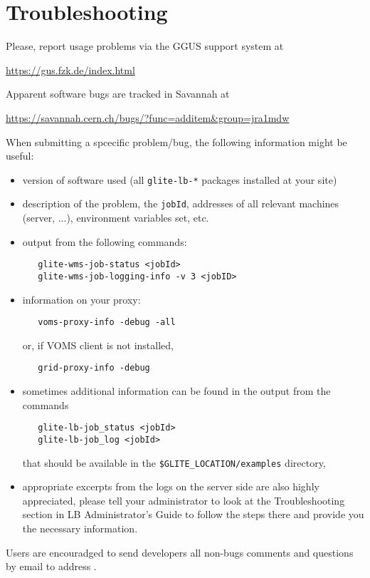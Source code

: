 \section{Troubleshooting}

Please, report usage problems via the GGUS support system at
\begin{center}
\url{https://gus.fzk.de/index.html}
\end{center}
Apparent software bugs are tracked in Savannah at
\begin{center}
\url{https://savannah.cern.ch/bugs/?func=additem&group=jra1mdw}
\end{center}

When submitting a \LB spcecific problem/bug, the following information might be useful:
\begin{itemize}
\item version of software used (all \verb'glite-lb-*' packages installed at your site)
\item description of the problem, the \verb'jobId', addresses of all relevant
 machines (\LB server, ...), environment variables set, etc.
\item output from the following commands:
\begin{verbatim}
   glite-wms-job-status <jobId>
   glite-wms-job-logging-info -v 3 <jobID>
\end{verbatim}
\item information on your proxy:
\begin{verbatim}
   voms-proxy-info -debug -all
\end{verbatim}
or, if VOMS client is not installed, 
\begin{verbatim}
   grid-proxy-info -debug 
\end{verbatim}
\item sometimes additional information can be found in the output from the commands
\begin{verbatim}
   glite-lb-job_status <jobId>
   glite-lb-job_log <jobId>
\end{verbatim}
that should be available in the \verb'$GLITE_LOCATION/examples' directory,
\item appropriate excerpts from the logs on the server side are also highly appreciated, 
please tell your administrator to look at the Troubleshooting section in LB Administrator's 
Guide \cite{lbag} to follow the steps there and provide you the necessary information.
\end{itemize}

Users are encouradged to send developers all non-bugs comments and questions by email to
address .

